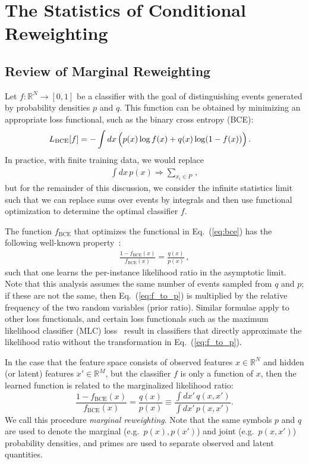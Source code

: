 \documentclass[aps,prx,reprint,preprintnumbers,superscriptaddress,nofootinbib,longbibliography,floatfix]{revtex4-2}
\DeclareRobustCommand{\Eq}[1]{Eq.~(\ref{eq:#1})}
\begin{document}
\section{The Statistics of Conditional Reweighting}
\label{sec:math}

\subsection{Review of Marginal Reweighting}

Let $f:\mathbb{R}^N \rightarrow [0,1]$ be a classifier with the goal of distinguishing events generated by probability densities $p$ and $q$.
%
This function can be obtained by minimizing an appropriate loss functional, such as the binary cross entropy (BCE):
%
\begin{align}
\label{eq:bce}
L_{\rm BCE}[f] =-\int dx\, \Big( & p(x) \log f(x) + q(x)  \log (1-f(x)) \Big)\,.
\end{align}
%
In practice, with finite training data, we would replace
%
\begin{align}
    \int dx \,p(x)\Rightarrow \sum_{x_i \in P}\,,
\end{align}
%
but for the remainder of this discussion, we consider the infinite statistics limit such that we can replace sums over events by integrals and then use functional optimization to determine the optimal classifier $f$.

The function $f_\text{BCE}$ that optimizes the functional in \Eq{bce} has the following well-known property~\cite{hastie01statisticallearning,sugiyama_suzuki_kanamori_2012}: 
%
\begin{align}
\label{eq:f_to_p}
    \frac{1-f_\text{BCE}(x)}{f_\text{BCE}(x)}=\frac{q(x)}{p(x)}\,,
\end{align}
%
such that one learns the per-instance likelihood ratio in the asymptotic limit.
%
Note that this analysis assumes the same number of events sampled from $q$ and $p$; if these are not the same, then \Eq{f_to_p} is multiplied by the relative frequency of the two random variables (prior ratio).
%
Similar formulae apply to other loss functionals, and certain loss functionals such as the maximum likelihood classifier (MLC) loss~\cite{DAgnolo:2018cun,2101.07263} result in classifiers that directly approximate the likelihood ratio without the transformation in \Eq{f_to_p}.

In the case that the feature space consists of observed features $x \in \mathbb{R}^N$ and hidden (or latent) features $x' \in \mathbb{R}^M$, but the classifier $f$ is only a function of $x$, then the learned function is related to the marginalized likelihood ratio:
%
\begin{equation}
    \label{eq:marginal_reweighting}
    \frac{1-f_\text{BCE}(x)}{f_\text{BCE}(x)} = \frac{q(x)}{p(x)} \equiv \frac{\int dx' \, q(x,x')}{\int dx' \, p(x,x')}.
\end{equation}
%
We call this procedure \emph{marginal reweighting}.
%
Note that the same symbols $p$ and $q$ are used to denote the marginal (e.g.~$p(x),p(x')$) and joint (e.g.~$p(x,x')$) probability densities, and primes are used to separate observed and latent quantities.
\end{document}
